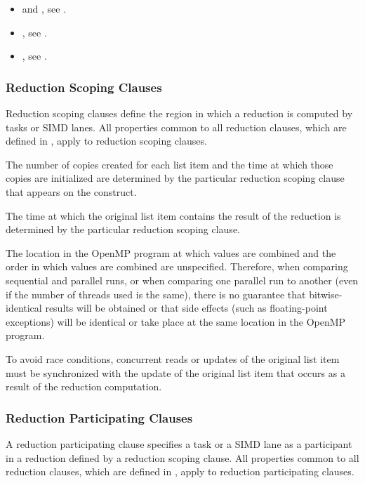 \crossreferences
\begin{itemize}
\item {} and , see
.

\item {}, see
.

\item {}, see
.

\end{itemize}



\subsubsection{Reduction Scoping Clauses}
\label{subsubsec:Reduction Scoping Clauses}
Reduction scoping clauses define the region in which a reduction is computed by
tasks or SIMD lanes. All properties common to all reduction clauses, which are 
defined in , apply 
to reduction scoping clauses.

The number of copies created for each list item and the time at which those
copies are initialized are determined by the particular reduction scoping clause
that appears on the construct.

The time at which the original list item contains the result of the reduction
is determined by the particular reduction scoping clause.

The location in the OpenMP program at which values are combined and the
order in which values are combined are unspecified. Therefore, when
comparing sequential and parallel runs, or when comparing one parallel run to
another (even if the number of threads used is the same), there is no guarantee
that bitwise-identical results will be obtained or that side effects (such as
floating-point exceptions) will be identical or take place at the same location
in the OpenMP program.

To avoid race conditions, concurrent reads or updates of the original list item
must be synchronized with the update of the original list item that occurs as a
result of the reduction computation.



\subsubsection{Reduction Participating Clauses}
\label{subsubsec:Reduction Participating Clauses}
A reduction participating clause specifies a task or a SIMD lane as a
participant in a reduction defined by a reduction scoping clause. All 
properties common to all reduction clauses, which are defined in 
, apply to
reduction participating clauses.


